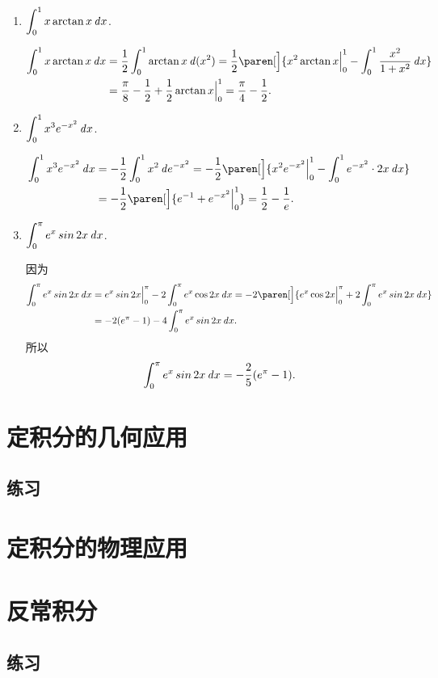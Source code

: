 \begin{enumerate}
\item \(\displaystyle \int_0^1 x \arctan x \mathop{}\!\mathit{d} x\).

  \ifshowsol
    \[
      \begin{split}
        \int_0^1 x \arctan x \dx
        &= \frac12 \int_0^1 \arctan x \diff(x^2)
          = \frac12 \paren[\Big]{x^2 \arctan x \Big\vert_0^1 - \int_0^1 \frac{x^2}{1+x^2} \dx} \\
        &= \frac\pi8 - \frac12 + \frac12 \arctan x \Big\vert_0^1
          = \frac\pi4 - \frac12.
      \end{split}
    \]
  \fi

\item \(\displaystyle \int_0^1 x^3 e^{-x^2} \mathop{}\!\mathit{d} x\).

  \ifshowsol
    \[
      \begin{split}
        \int_0^1 x^3 e^{-x^2} \dx
        &= - \frac12 \int_0^1 x^2 \diff e^{-x^2}
          = - \frac12 \paren[\Big]{x^2 e^{-x^2} \Big\vert_0^1 - \int_0^1 e^{-x^2} \cdot 2x \dx} \\
        &= - \frac12 \paren[\Big]{e^{-1} + e^{-x^2} \Big\vert_0^1}
          = \frac12 - \frac1e.
      \end{split}
    \]
  \fi

\item \(\displaystyle \int_0^\pi e^x \operatorname{\smash{sin}} 2x \mathop{}\!\mathit{d} x\).

  \ifshowsol
    因为
    \[
      \begin{split}
        \int_0^\pi e^x \sin 2x \dx
        &= e^x \sin 2x \Big\vert_0^\pi - 2 \int_0^\pi e^x \cos 2x \dx
          = -2 \paren[\Big]{e^x \cos 2x \Big\vert_0^\pi + 2 \int_0^\pi e^x \sin 2x \dx} \\
        &= -2(e^\pi - 1) - 4 \int_0^\pi e^x \sin 2x \dx.
      \end{split}
    \]
    所以
    \[
      \int_0^\pi e^x \operatorname{\smash{sin}} 2x \mathop{}\!\mathit{d} x = -\frac25 (e^\pi - 1).
    \]
  \fi
\end{enumerate}
\fi

\section{定积分的几何应用}

\ifshowex
{}
\subsection*{练习}
\fi


\section{定积分的物理应用}

\section{反常积分}

\ifshowex
{}
\subsection*{练习}
\fi

